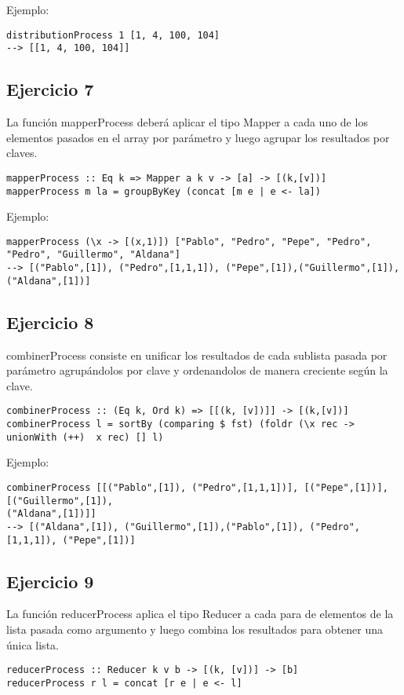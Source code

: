 \documentclass[10pt, a4paper,english,spanish,hidelinks]{article}
\begin{document}
Ejemplo:
\begin{verbatim}
distributionProcess 1 [1, 4, 100, 104]
--> [[1, 4, 100, 104]]
\end{verbatim}

\subsection{Ejercicio 7}
La función mapperProcess deberá aplicar el tipo Mapper a cada uno de los elementos pasados en el array por parámetro y luego agrupar los resultados por claves. 
\begin{verbatim}
mapperProcess :: Eq k => Mapper a k v -> [a] -> [(k,[v])]
mapperProcess m la = groupByKey (concat [m e | e <- la])
\end{verbatim}

Ejemplo:
\begin{verbatim}
mapperProcess (\x -> [(x,1)]) ["Pablo", "Pedro", "Pepe", "Pedro", "Pedro", "Guillermo", "Aldana"] 
--> [("Pablo",[1]), ("Pedro",[1,1,1]), ("Pepe",[1]),("Guillermo",[1]), ("Aldana",[1])]
\end{verbatim}
     
\subsection{Ejercicio 8}
combinerProcess consiste en unificar los resultados de cada sublista pasada por parámetro agrupándolos por clave y ordenandolos de manera creciente según la clave. 
\begin{verbatim}
combinerProcess :: (Eq k, Ord k) => [[(k, [v])]] -> [(k,[v])]
combinerProcess l = sortBy (comparing $ fst) (foldr (\x rec -> unionWith (++)  x rec) [] l)
\end{verbatim}

Ejemplo:
\begin{verbatim}
combinerProcess [[("Pablo",[1]), ("Pedro",[1,1,1])], [("Pepe",[1])],[("Guillermo",[1]), 
("Aldana",[1])]]
--> [("Aldana",[1]), ("Guillermo",[1]),("Pablo",[1]), ("Pedro",[1,1,1]), ("Pepe",[1])]
\end{verbatim}

      
\subsection{Ejercicio 9}
La función reducerProcess aplica el tipo Reducer a cada para de elementos de la lista pasada como argumento y luego combina los resultados para obtener una única lista. 
\begin{verbatim}
reducerProcess :: Reducer k v b -> [(k, [v])] -> [b]
reducerProcess r l = concat [r e | e <- l]
\end{verbatim}
\end{document}
